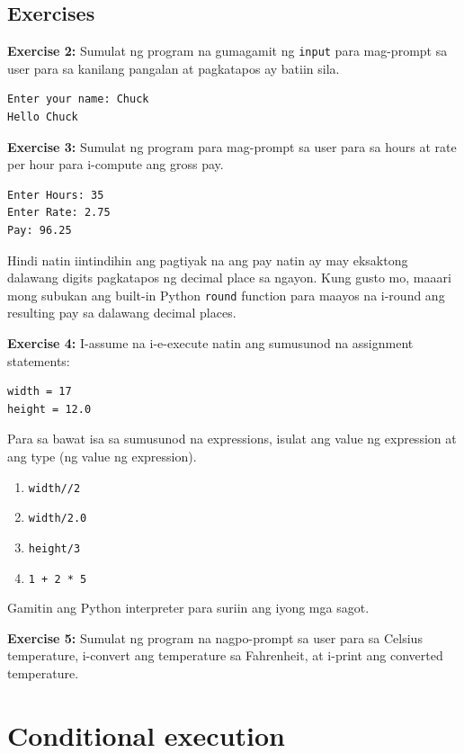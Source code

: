 \documentclass[10pt,]{book}
\begin{document}
\section{Exercises}\label{exercises-1}

\textbf{Exercise 2:} Sumulat ng program na gumagamit ng \texttt{input}
para mag-prompt sa user para sa kanilang pangalan at pagkatapos ay
batiin sila.

{\small
\begin{verbatim}
Enter your name: Chuck
Hello Chuck
\end{verbatim}
}

\textbf{Exercise 3:} Sumulat ng program para mag-prompt sa user para sa
hours at rate per hour para i-compute ang gross pay.

{\small
\begin{verbatim}
Enter Hours: 35
Enter Rate: 2.75
Pay: 96.25
\end{verbatim}
}

Hindi natin iintindihin ang pagtiyak na ang pay natin ay may eksaktong
dalawang digits pagkatapos ng decimal place sa ngayon. Kung gusto mo,
maaari mong subukan ang built-in Python \texttt{round} function para
maayos na i-round ang resulting pay sa dalawang decimal places.

\textbf{Exercise 4:} I-assume na i-e-execute natin ang sumusunod na
assignment statements:

{\small
\begin{verbatim}
width = 17
height = 12.0
\end{verbatim}
}

Para sa bawat isa sa sumusunod na expressions, isulat ang value ng
expression at ang type (ng value ng expression).

\begin{enumerate}
\def\labelenumi{\arabic{enumi}.}
\item
  \texttt{width//2}
\item
  \texttt{width/2.0}
\item
  \texttt{height/3}
\item
  \texttt{1\ +\ 2\ *\ 5}
\end{enumerate}

Gamitin ang Python interpreter para suriin ang iyong mga sagot.

\textbf{Exercise 5:} Sumulat ng program na nagpo-prompt sa user para sa
Celsius temperature, i-convert ang temperature sa Fahrenheit, at i-print
ang converted temperature.

\chapter{Conditional execution}\label{conditional-execution}
\end{document}
